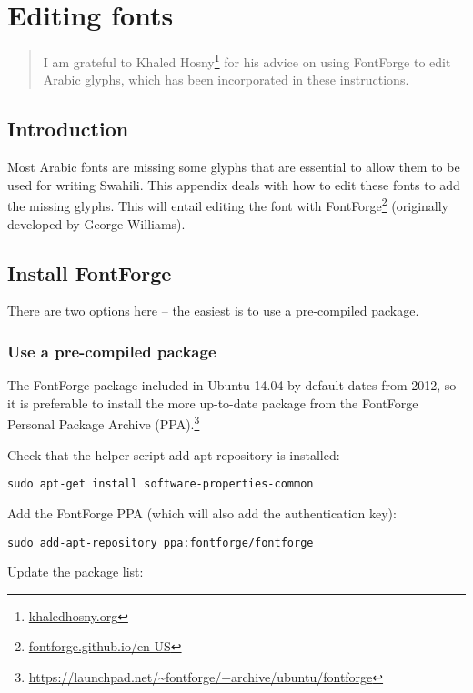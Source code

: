 \chapter{Editing fonts}
\renewcommand{\thesection}{B/\arabic{section}}  %
\setcounter{section}{0}  %
\label{appB}

\begin{quotation}
\noindent I am grateful to Khaled Hosny\footnote{\url{khaledhosny.org}} for his advice on using FontForge to edit Arabic glyphs, which has been incorporated in these instructions.
\end{quotation}

\section{Introduction}
\label{appb:intro}

Most Arabic fonts are missing some glyphs that are essential to allow them to be used for writing Swahili.  This appendix deals with how to edit these fonts to add the missing glyphs.  This will entail editing the font with FontForge\footnote{\url{fontforge.github.io/en-US}} (originally developed by George Williams).

\section{Install FontForge}

There are two options here -- the easiest is to use a pre-compiled package.

\subsection{Use a pre-compiled package}

The FontForge package included in Ubuntu 14.04 by default dates from 2012, so it is preferable to install the more up-to-date package from the FontForge Personal Package Archive (PPA).\footnote{\url{https://launchpad.net/~fontforge/+archive/ubuntu/fontforge}}

Check that the helper script add-apt-repository is installed:

\verb|sudo apt-get install software-properties-common|

Add the FontForge PPA (which will also add the authentication key):

\verb|sudo add-apt-repository ppa:fontforge/fontforge|

Update the package list:

